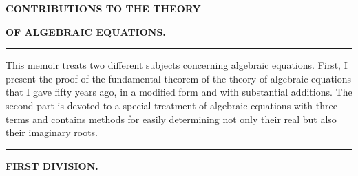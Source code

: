 \begin{center}
{\large\bfseries CONTRIBUTIONS TO THE THEORY\par}
\medskip
{\Large\bfseries OF ALGEBRAIC EQUATIONS.\par}
\medskip
\rule{0.18\linewidth}{0.4pt}
\end{center}

This memoir treats two different subjects concerning algebraic equations. First, I present the proof of the fundamental theorem of the theory of algebraic equations that I gave fifty years ago, in a modified form and with substantial additions. The second part is devoted to a special treatment of algebraic equations with three terms and contains methods for easily determining not only their real but also their imaginary roots.

\begin{center}
\rule{0.18\linewidth}{0.4pt}\par
\medskip
\textbf{FIRST DIVISION.}
\end{center}

